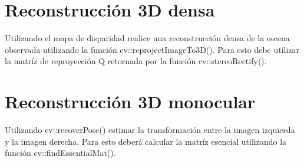 \documentclass[tp]{lcc}
\begin{document}
\section{Reconstrucción 3D densa}
Utilizando el mapa de disparidad realice una reconstrucción densa de la escena observada utilizando la función cv::reprojectImageTo3D(). Para esto debe utilizar la matríz de reproyección Q retornada por la función cv::stereoRectify().

\section{Reconstrucción 3D monocular}
Utilizando cv::recoverPose() estimar la transformación entre la imagen izquierda y la imagen derecha. Para esto deberá calcular la matríz esencial utilizando la función cv::findEssentialMat().

\printbibliography
\end{document}
